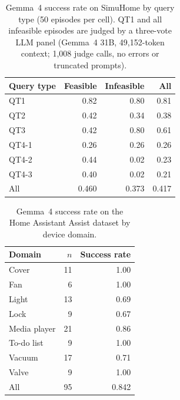 \documentclass[a4paper,11pt]{article}
\begin{document}
\begin{table}[t]
  \centering
  \small
  \caption{Gemma~4 success rate on SimuHome by query type (50 episodes per cell). QT1 and all
    infeasible episodes are judged by a three-vote LLM panel (Gemma~4 31B, 49,152-token context;
    1,008 judge calls, no errors or truncated prompts).}
  \label{tab:gemma4-simuhome}
  \begin{tabular}{lrrr}
    \toprule
    Query type & Feasible & Infeasible & All   \\
    \midrule
    QT1        & 0.82     & 0.80       & 0.81  \\
    QT2        & 0.42     & 0.34       & 0.38  \\
    QT3        & 0.42     & 0.80       & 0.61  \\
    QT4-1      & 0.26     & 0.26       & 0.26  \\
    QT4-2      & 0.44     & 0.02       & 0.23  \\
    QT4-3      & 0.40     & 0.02       & 0.21  \\
    \midrule
    All        & 0.460    & 0.373      & 0.417 \\
    \bottomrule
  \end{tabular}
\end{table}

\begin{table}[t]
  \centering
  \small
  \caption{Gemma~4 success rate on the Home Assistant Assist dataset by device domain.}
  \label{tab:gemma4-homeassistant}
  \begin{tabular}{lrr}
    \toprule
    Domain        & $n$ & Success rate \\
    \midrule
    Cover         & 11  & 1.00 \\
    Fan           & 6   & 1.00 \\
    Light         & 13  & 0.69 \\
    Lock          & 9   & 0.67 \\
    Media player  & 21  & 0.86 \\
    To-do list    & 9   & 1.00 \\
    Vacuum        & 17  & 0.71 \\
    Valve         & 9   & 1.00 \\
    \midrule
    All           & 95  & 0.842 \\
    \bottomrule
  \end{tabular}
\end{table}
\end{document}
